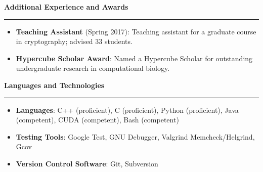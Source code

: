 \documentclass[10pt,letterpaper]{article}
\begin{document}
\medskip

\begin{large}
    \textbf{Additional Experience and Awards}
\end{large}

\smallskip \hrule \smallskip

\begin{itemize}[topsep=0pt]
    \setlength\itemsep{0.1em}
    \item \textbf{Teaching Assistant} (Spring 2017): Teaching assistant for a
          graduate course in cryptography; advised 33 students.
    \item \textbf{Hypercube Scholar Award}: Named a Hypercube Scholar for
          outstanding undergraduate research in computational biology.
\end{itemize}

\medskip

\begin{large}
    \textbf{Languages and Technologies}
\end{large}

\smallskip \hrule \smallskip

\begin{itemize}[topsep=0pt]
    \setlength\itemsep{0.1em}
    \item \textbf{Languages}: C++ (proficient), C (proficient),
          Python (proficient), Java (competent), CUDA (competent),
          Bash (competent)
    \item \textbf{Testing Tools}: Google Test, GNU Debugger, Valgrind
          Memcheck/Helgrind, Gcov
    \item \textbf{Version Control Software}: Git, Subversion
\end{itemize}
\end{document}
